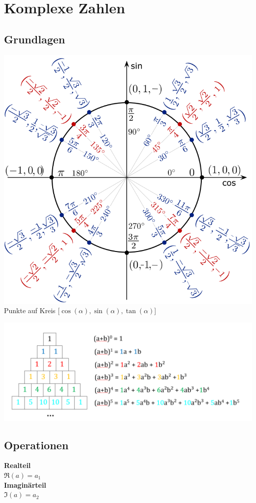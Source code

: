 \section{Komplexe Zahlen}
\subsection{Grundlagen}
\begin{center}
	\includegraphics[width=0.6\columnwidth]{Images/einheitskreis}\\
	Punkte auf Kreis [$\cos(\alpha), \sin(\alpha), \tan(\alpha)$]
\end{center}

\begin{center}
	\includegraphics[width=\columnwidth]{Images/pascaldreieck}\\
\end{center}


\subsection{Operationen}
\noindent\textbf{Realteil}\\
$\Re(a) = a_1$\\

\noindent\textbf{Imaginärteil}\\
$\Im(a) = a_2$\\

